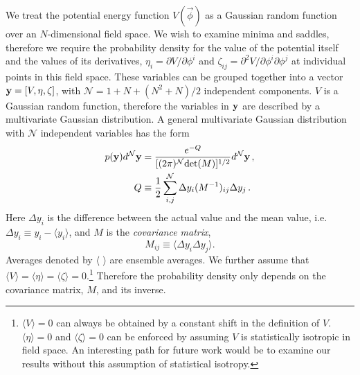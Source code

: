 \documentclass[12pt]{article}
\begin{document}
We treat the potential energy function $V({\vec{\phi}})$ as a Gaussian random function over an $N$-dimensional field space. We wish to examine minima and saddles, therefore we require the probability density for the value of the potential itself and the values of its derivatives, $\eta_i = \partial V/\partial \phi^i$ and $\zeta_{ij}=\partial^2 V/\partial \phi^i\partial \phi^j$ at individual points in this field space. These variables can be grouped together into a vector ${\bf y} = [V,\eta,\zeta]$, with $\mathcal{N}=1+N+(N^2+N)/2$ independent components. $V$ is a Gaussian random function, therefore the variables in ${\bf y}$ are described by a multivariate Gaussian distribution. A general multivariate Gaussian distribution with $\mathcal{N}$ independent variables has the form
\begin{equation} \label{MultivariateGaussian}
\begin{split}
p({\bf y})d^\mathcal{N}{\bf y} &= \frac{e^{-Q}}{[(2\pi)^\mathcal{N} \mathrm{det}(M)]^{1/2}} d^\mathcal{N}{\bf y} \, ,\\
Q &\equiv \frac{1}{2} \sum_{i,j}^\mathcal{N} \Delta y_i (M^{-1})_{ij} \Delta y_{j} \, .\\
\end{split}
\end{equation}
%
Here $\Delta y_i$ is the difference between the actual value and the mean value, i.e. $\Delta y_i \equiv y_i - \langle y_i \rangle$, and $M$ is the \emph{covariance matrix}, 
%
\begin{equation}
M_{ij} \equiv \langle \Delta y_i \Delta y_j \rangle.
\end{equation}
%
Averages denoted by $\langle \,\,\rangle$ are ensemble averages. We further assume that $\langle V\rangle = \langle \eta\rangle = \langle \zeta\rangle = 0$.\footnote{$\langle V\rangle=0$ can always be obtained by a constant shift in the definition of $V$. $\langle \eta \rangle = 0$ and $\langle \zeta\rangle = 0$ can be enforced by assuming $V$ is statistically isotropic in field space. An interesting path for future work would be to examine our results without this assumption of statistical isotropy.} Therefore the probability density only depends on the covariance matrix, $M$, and its inverse.
\end{document}
